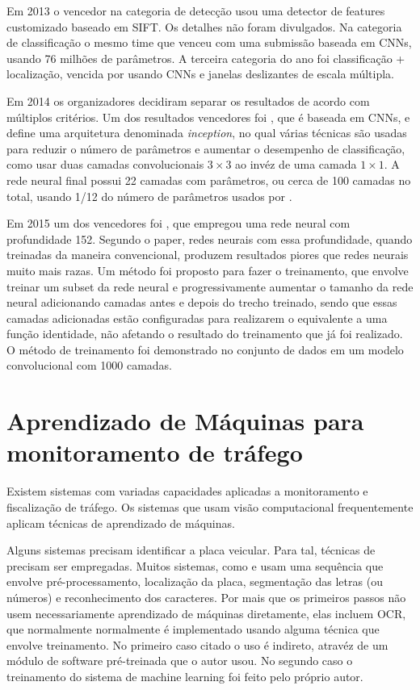 Em 2013 o vencedor na categoria de detecção usou uma detector de features
customizado baseado em SIFT. Os detalhes não foram divulgados. Na categoria de
classificação o mesmo time que venceu com uma submissão baseada em CNNs, usando
76 milhões de parâmetros. A terceira categoria do ano foi classificação +
localização, vencida por \cite{sermanet2013overfeat} usando CNNs e janelas
deslizantes de escala múltipla.

Em 2014 os organizadores decidiram separar os resultados de acordo com
múltiplos critérios. Um dos resultados vencedores foi
\cite{szegedy2015going}, que é baseada em CNNs, e define uma arquitetura
denominada \emph{inception}, no qual várias técnicas são usadas para reduzir o
número de parâmetros e aumentar o desempenho de classificação, como usar
duas camadas convolucionais $3 \times 3$ ao invéz de uma camada $1 \times 1$. A
rede neural final possui 22 camadas com parâmetros, ou cerca de 100 camadas no
total, usando 1/12 do número de parâmetros usados por
\cite{krizhevsky2012imagenet}.

Em 2015 um dos vencedores foi \cite{he2015deep}, que empregou uma rede neural
com profundidade 152. Segundo o paper, redes neurais com essa profundidade,
quando treinadas da maneira convencional, produzem resultados piores que redes
neurais muito mais razas. Um método foi proposto para fazer o treinamento, que
envolve treinar um subset da rede neural e progressivamente aumentar o tamanho
da rede neural adicionando camadas antes e depois do trecho treinado, sendo que
essas camadas adicionadas estão configuradas para realizarem o equivalente a
uma função identidade, não afetando o resultado do treinamento que já foi
realizado. O método de treinamento foi demonstrado no conjunto de dados
 em um modelo
convolucional com 1000 camadas.

\section{Aprendizado de Máquinas para monitoramento de tráfego}

Existem sistemas com variadas capacidades aplicadas a monitoramento e
fiscalização de tráfego. Os sistemas que usam visão computacional
frequentemente aplicam técnicas de aprendizado de máquinas.

Alguns sistemas precisam identificar a placa veicular. Para tal, técnicas de
 precisam ser empregadas. Muitos sistemas, como
\cite{qadri2009automatic} e \cite{kranthi2011automatic} usam uma sequência que
envolve pré-processamento, localização da placa, segmentação das letras (ou
números) e reconhecimento dos caracteres. Por mais que os primeiros passos não
usem necessariamente aprendizado de máquinas diretamente, elas incluem OCR,
que normalmente normalmente é implementado usando alguma técnica que envolve
treinamento.
No primeiro caso citado o uso é indireto, atravéz de um módulo de software
pré-treinada que o autor usou. No segundo caso o treinamento do sistema de
machine learning foi feito pelo próprio autor.

